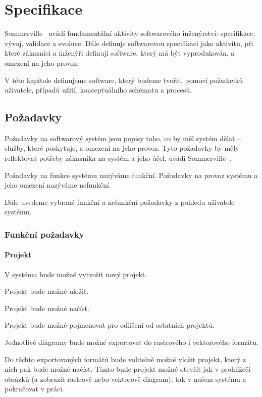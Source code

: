 \chapter{Specifikace}

Sommerville~\cite{sommerville_softwareengineering_2011} uvádí fundamentální aktivity softwarového inženýrství: specifikace, vývoj, validace a evoluce.
Dále definuje softwarovou specifikaci jako aktivitu, při které zákazníci a inženýři definují software, který má být vyprodukován, a omezení na jeho provoz.

V této kapitole definujeme software, který budeme tvořit, pomocí požadavků uživatele, případů užití, konceptuálního schématu a procesů.

\section{Požadavky}

Požadavky na softwarový systém jsou popisy toho, co by měl systém dělat -- služby, které poskytuje, a omezení na jeho provoz.
Tyto požadavky by měly reflektovat potřeby zákazníka na systém a jeho účel, uvádí Sommerville~\cite[s.~83]{sommerville_softwareengineering_2011}.

Požadavky na funkce systému nazýváme funkční.
Požadavky na provoz systému a jeho omezení nazýváme nefunkční.

Dále uvedeme vybrané funkční a nefunkční požadavky z pohledu uživatele systému.

\subsection{Funkční požadavky}

\subsubsection*{Projekt}
\begin{enumfp}
  \item V systému bude možné vytvořit nový projekt.
  \item Projekt bude možné uložit.
  \item Projekt bude možné načíst.
  \item Projekt bude možné pojmenovat pro odlišení od ostatních projektů.
  \item Jednotlivé diagramy bude možné exportovat do rastrového i vektorového formátu.
  \item Do těchto exportovaných formátů bude volitelně možné vložit projekt, který z nich pak bude možné načíst.
  Tímto bude projekt možné otevřít jak v prohlížeči obrázků (a zobrazit rastrově nebo vektorově diagram), tak v našem systému a pokračovat v práci.
\end{enumfp}

